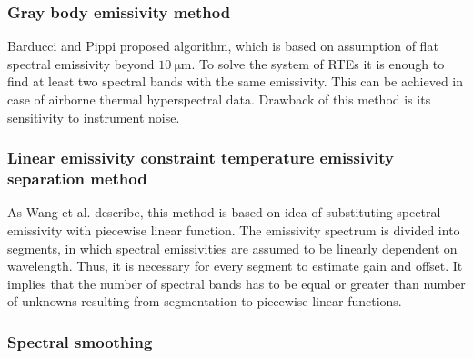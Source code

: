 \subsubsection*{Gray body emissivity method}

Barducci and Pippi \cite{BP96} proposed algorithm, which is based on assumption of flat spectral emissivity beyond $\SI{10}{\micro\meter}$. To solve the system of RTEs it is enough to find at least two spectral bands with the same emissivity. This can be achieved in case of airborne thermal hyperspectral data. Drawback of this method is its sensitivity to instrument noise.

\subsubsection*{Linear emissivity constraint temperature emissivity separation method}

As Wang et al. \cite{WW11} describe, this method is based on idea of substituting spectral emissivity with piecewise linear function. The emissivity spectrum is divided into segments, in which spectral emissivities are assumed to be linearly dependent on wavelength. Thus, it is necessary for every segment to estimate gain and offset. It implies that the number of spectral bands has to be equal or greater than number of unknowns resulting from segmentation to piecewise linear functions.

\subsubsection*{Spectral smoothing}

